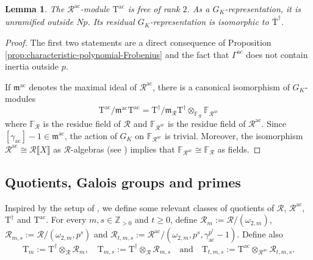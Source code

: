 \documentclass[12pt,reqno]{amsart}
\newtheorem{lemma}[theorem]{Lemma}
\theoremstyle{definition}
\theoremstyle{remark}
\newcommand{\numberset}{\mathbb}
\newcommand{\Z}{\numberset{Z}}
\newcommand{\T}{\boldsymbol{\mathrm{T}}}
\newcommand{\calR}{\mathcal{R}}
\newcommand{\ac}{\mathrm{ac}}
\newcommand{\F}{\numberset{F}}
\newcommand{\m}{\mathfrak{m}}
\begin{document}
\begin{lemma}\label{lem:residual-representation-Iwasawa-irreducible}
    The $\mathcal{R}^{\ac}$-module $\T^{\ac}$ is free of rank $2$. As a $G_K$-representation, it is unramified outside $Np$. Its residual $G_K$-representation is isomorphic to $\bar{\T}^{\dag}$.
\end{lemma}
\begin{proof}
    The first two statements are a direct consequence of Proposition \ref{prop:characteristic-polynomial-Frobenius} and the fact that $\Gamma^{\ac}$ does not contain inertia outside $p$.

    If $\m^{\ac}$ denotes the maximal ideal of $\mathcal{R}^{\ac}$, there is a canonical isomorphism of $G_K$-modules
    \begin{equation*}
        \T^{\ac}/\m^{\ac}\T^{\ac}=\T^\dag/\m_{\mathcal{R}}\T^\dag\otimes_{\F_\mathcal{R}}\F_{\mathcal{R}^{\ac}}
    \end{equation*}
    where $\F_\mathcal{R}$ is the residue field of $\mathcal{R}$ and $\F_{\mathcal{R}^{\ac}}$ is the residue field of $\mathcal{R}^{\ac}$. Since $[\gamma_{\ac}]-1\in\m^{\ac}$, the action of $G_K$ on $\F_{\mathcal{R}^{\ac}}$ is trivial. Moreover, the isomorphism $\mathcal{R}^{\ac}\cong \mathcal{R}\llbracket X\rrbracket$ as $\mathcal{R}$-algebras (see \cite[Proposition 5.3.5]{Neukirch-Schmidt-Wingberg:cohomology-of-number-fields}) implies that $\F_{\mathcal{R}^{\ac}}\cong \F_\mathcal{R}$ as fields. 
\end{proof}


\subsection{Quotients, Galois groups and primes}\label{sec:quotients-galois-groups-and-primes}

Inspired by the setup of \cite{buyukboduk2011:lambda, Buyukboduk:big-Heegner-point-kolyvagin-system, Buyukboduk:deformations-of-kolyvagin-systems}, we define some relevant classes of quotients of $\mathcal{R}$, $\mathcal{R}^\ac$, $\T^\dag$ and $\T^\ac$. For every $m,s\in\Z_{>0}$ and $t\ge 0$, define $\calR_m:=\mathcal{R}/(\omega_{2,m})$, $\calR_{m,s}:=\mathcal{R}/(\omega_{2,m},p^s)$ and $\calR_{t,m,s}:=\mathcal{R}^{\ac}/(\omega_{2,m}, p^s, \gamma_{\ac}^{p^t}-1)$. Define also 
    \begin{equation*}
        \T_m:=\T^\dag\otimes_{\mathcal{R}}\calR_m,\quad \T_{m,s}:=\T^\dag\otimes_{\mathcal{R}}\calR_{m,s}\quad\text{and}\quad \T_{t,m,s}:=\T^{\ac}\otimes_{\mathcal{R}^{\ac}}\calR_{t,m,s}.
    \end{equation*}
\end{document}
